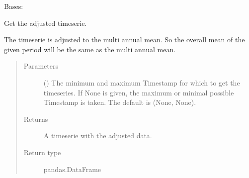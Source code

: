 \documentclass[letterpaper,10pt,english]{sphinxmanual}
\begin{document}
\begin{fulllineitems}
\label{\detokenize{weatherDB:weatherDB.station.StationTETBase}}
\sphinxAtStartPar
Bases: {\hyperref[\detokenize{weatherDB:weatherDB.station.StationBase}]{}}

\begin{fulllineitems}
\label{\detokenize{weatherDB:weatherDB.station.StationTETBase.get_adj}}
\sphinxAtStartPar
Get the adjusted timeserie.

\sphinxAtStartPar
The timeserie is adjusted to the multi annual mean.
So the overall mean of the given period will be the same as the multi annual mean.
\begin{quote}\begin{description}
\item[{Parameters}] \leavevmode
\sphinxAtStartPar
{} ({\hyperref[\detokenize{weatherDB.lib:weatherDB.lib.utils.TimestampPeriod}]{}}\sphinxstyleliteralemphasis{\sphinxupquote{(}}\sphinxstyleliteralemphasis{\sphinxupquote{)}}\sphinxstyleliteralemphasis{\sphinxupquote{, }}) \textendash{} The minimum and maximum Timestamp for which to get the timeseries.
If None is given, the maximum or minimal possible Timestamp is taken.
The default is (None, None).

\item[{Returns}] \leavevmode
\sphinxAtStartPar
A timeserie with the adjusted data.

\item[{Return type}] \leavevmode
\sphinxAtStartPar
pandas.DataFrame


\end{description}
\end{quote}
\end{fulllineitems}
\end{fulllineitems}
\end{document}
